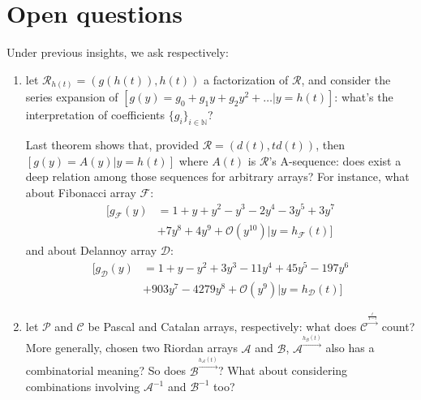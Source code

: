 

\section{Open questions}

Under previous insights, we ask respectively:
\begin{enumerate}
    \item let $\mathcal{R}_{h(t)}=\left(g(h(t)), h(t)\right)$ a factorization of $\mathcal{R}$,
        and consider the series expansion of $[g(y)=g_0 + g_1 y + g_2 y^2 + \ldots|y=h(t)]$: 
        what's the interpretation of coefficients $\lbrace g_i\rbrace_{i\in\mathbb{N}}$? 
        
        Last theorem shows that, provided $\mathcal{R}=\left(d(t), td(t)\right)$, then 
        $[g(y)=A(y)|y=h(t)]$ where $A(t)$ is $\mathcal{R}$'s A-sequence: 
        does exist a deep relation among those sequences for arbitrary arrays?   
        For instance, what about Fibonacci array $\mathcal{F}$: 
        \begin{displaymath}
            \begin{split}
                \big[ g_{\mathcal{F}}(y) &= 1 + y + y^{2} - y^{3} -2y^{4} 
                -3 y^{5}  +3 y^{7} \\
                &+7 y^{8} +4 y^{9} + \mathcal{O}\left(y^{10}\right) | y=h_{\mathcal{F}}(t) \big]
            \end{split}
        \end{displaymath}
        and about Delannoy array $\mathcal{D}$: 
        \begin{displaymath}
            \begin{split}
                \big[ g_{\mathcal{D}}(y) &= 1 + y - y^{2} + 3 y^{3} -11y^{4} + 45 y^{5} -197y^{6}\\ 
                &+ 903 y^{7} -4279y^{8} + \mathcal{O}\left(y^{9}\right)| y=h_{\mathcal{D}}(t) \big]
            \end{split}
        \end{displaymath}
    \item let $\mathcal{P}$ and $\mathcal{C}$ be Pascal and Catalan arrays, respectively: 
        what does $\mathcal{C}^{\stackrel{\frac{t}{1-t}}{\rightarrow}}$ count? 
        More generally, chosen two Riordan arrays $\mathcal{A}$ and $\mathcal{B}$, 
        $\mathcal{A}^{\stackrel{h_{\mathcal{B}}(t)}{\rightarrow}}$ also has a combinatorial meaning? 
        So does $\mathcal{B}^{\stackrel{h_{\mathcal{A}}(t)}{\rightarrow}}$? What about considering
        combinations involving  $\mathcal{A}^{-1}$ and $\mathcal{B}^{-1}$ too?



\end{enumerate}
